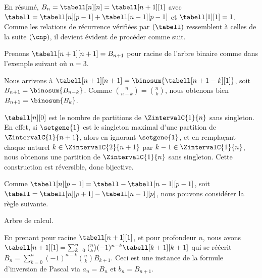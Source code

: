 En résumé,
$B_n = \tabell[n][n] = \tabell[n+1][1]$
avec
$\tabell = \tabell[n][p-1] + \tabell[n-1][p-1]$
et
$\tabell[1][1] = 1$.
Comme les relations de récurrence vérifiées par $(\tabell)$ ressemblent à celles de la suite $(\cnp)$,
il devient évident de procéder comme suit.

\explaintree{\tabell}{\tabell[n-1][p-1]}{\tabell[n][p-1]}%
            {\bellintertree}{}

Prenons $\tabell[n+1][n+1] = B_{n+1}$ pour racine de l'arbre binaire comme dans l'exemple suivant où $n = 3$.


Nous arrivons à
$\tabell[n+1][n+1] = \binosum{\tabell[n+1-k][1]}$,
soit
$B_{n+1} = \binosum{B_{n-k}}$.
Comme $\binom{n}{n-k} = \binom{n}{k}$, nous obtenons bien 
$B_{n+1} = \binosum{B_k}$.




\begin{remark} \label{val-bell-n-0}
    $\tabell[n][0]$ est le nombre de partitions de $\ZintervalC{1}{n}$ sans singleton.
    En effet,
    si $\setgene{1}$ est le singleton maximal d'une partition de $\ZintervalC{1}{n+1}$,
    alors
    en ignorant $\setgene{1}$, 
    et
    en remplaçant chaque naturel $k \in \ZintervalC{2}{n+1}$ par $k-1 \in \ZintervalC{1}{n}$, nous obtenons une partition de $\ZintervalC{1}{n}$ sans singleton.
    Cette construction est réversible, donc bijective.
\end{remark}




\begin{remark}
	Comme $\tabell[n][p-1] = \tabell - \tabell[n-1][p-1]$,
	soit $\tabell = \tabell[n][p+1] - \tabell[n-1][p]$,
	nous pouvons considérer la règle suivante.

    \begin{center}
    	\itshape\centering
    
    	\calctree{\tabell}{\tabell[n][p+1]}{-\tabell[n-1][p]}
    	
    	Arbre de calcul.
    \end{center}
    
    En prenant pour racine $\tabell[n+1][1]$, et pour profondeur $n$,
	nous avons
    $\tabell[n+1][1] = \sum_{k=0}^n \binom{n}{k} (-1)^{n-k} \tabell[k+1][k+1]$
    qui se réécrit
    $B_n = \sum_{k=0}^n (-1)^{n-k} \binom{n}{k} B_{k+1}$.
	Ceci est une instance de la formule d'inversion de Pascal via
    $a_n = B_n$
    et
    $b_n = B_{n+1}$.
\end{remark}